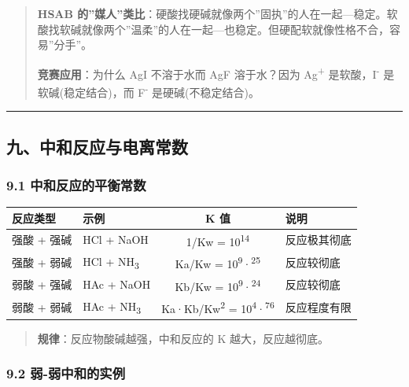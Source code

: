 \begin{quote}
\textbf{HSAB 的''媒人''类比}：硬酸找硬碱就像两个''固执''的人在一起---稳定。软酸找软碱就像两个''温柔''的人在一起---也稳定。但硬配软就像性格不合，容易''分手''。

\textbf{竞赛应用}：为什么 AgI 不溶于水而 AgF 溶于水？因为 Ag\textsuperscript{+} 是软酸，I\textsuperscript{-} 是软碱(稳定结合)，而 F\textsuperscript{-} 是硬碱(不稳定结合)。
\end{quote}

\begin{center}\rule{0.5\linewidth}{0.5pt}\end{center}

\subsection{九、中和反应与电离常数}\label{ux4e5dux4e2dux548cux53cdux5e94ux4e0eux7535ux79bbux5e38ux6570}

\subsubsection{9.1 中和反应的平衡常数}\label{ux4e2dux548cux53cdux5e94ux7684ux5e73ux8861ux5e38ux6570}

{\def\LTcaptype{none} %
\begin{longtable}[]{@{}llcl@{}}
\toprule\noalign{}
反应类型 & 示例 & K 值 & 说明 \\
\midrule\noalign{}
\endhead
\bottomrule\noalign{}
\endlastfoot
强酸 + 强碱 & HCl + NaOH & 1/Kw = 10\textsuperscript{14} & 反应极其彻底 \\
强酸 + 弱碱 & HCl + NH\textsubscript{3} & Ka/Kw = 10\textsuperscript{9}·\textsuperscript{25} & 反应较彻底 \\
弱酸 + 强碱 & HAc + NaOH & Kb/Kw = 10\textsuperscript{9}·\textsuperscript{24} & 反应较彻底 \\
弱酸 + 弱碱 & HAc + NH\textsubscript{3} & Ka·Kb/Kw\textsuperscript{2} = 10\textsuperscript{4}·\textsuperscript{76} & 反应程度有限 \\
\end{longtable}
}

\begin{quote}
\textbf{规律}：反应物酸碱越强，中和反应的 K 越大，反应越彻底。
\end{quote}

\subsubsection{9.2 弱-弱中和的实例}\label{ux5f31-ux5f31ux4e2dux548cux7684ux5b9eux4f8b}

